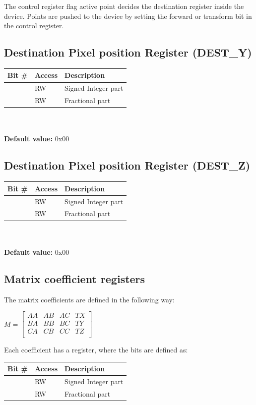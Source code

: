 \documentclass[10pt,a4paper]{article}
\begin{document}
The control register flag active point decides the destination register inside the device. Points are pushed to the device by setting the forward or transform bit in the control register.

\subsection{Destination Pixel position Register (DEST\_Y)}
\begin{tabular}{|l|l|l|}
\hline \textbf{Bit \#} & \textbf{Access} & \textbf{Description} \\ 
\hline
\hline [31:16] & RW & Signed Integer part \\
\hline [15:0]  & RW & Fractional part \\
\hline 
\end{tabular}
\\\\
\textbf{Default value:} 0x00

\subsection{Destination Pixel position Register (DEST\_Z)}
\begin{tabular}{|l|l|l|}
\hline \textbf{Bit \#} & \textbf{Access} & \textbf{Description} \\ 
\hline
\hline [31:16] & RW & Signed Integer part \\
\hline [15:0]  & RW & Fractional part \\
\hline 
\end{tabular}
\\\\
\textbf{Default value:} 0x00

\subsection{Matrix coefficient registers}
The matrix coefficients are defined in the following way:

$
M
=
\left[
\begin{array}{cccc}
AA & AB & AC & TX \\ 
BA & BB & BC & TY \\ 
CA & CB & CC & TZ \\
\end{array}
\right]
$

Each coefficient has a register, where the bits are defined as:

\begin{tabular}{|l|l|l|}
\hline \textbf{Bit \#} & \textbf{Access} & \textbf{Description} \\ 
\hline
\hline [31:16] & RW & Signed Integer part \\
\hline [15:0]  & RW & Fractional part \\
\hline 
\end{tabular}
\end{document}
